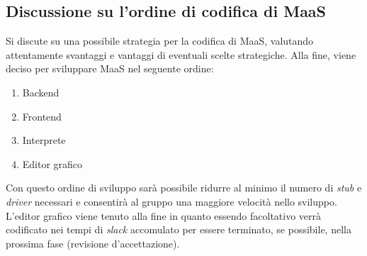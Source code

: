 \documentclass[11pt]{meetingmins}
\begin{document}
\subsection{Discussione su l'ordine di codifica di MaaS}

Si discute su una possibile strategia per la codifica di MaaS, valutando attentamente svantaggi e vantaggi di eventuali scelte strategiche. Alla fine, viene deciso per sviluppare MaaS nel seguente ordine:
\begin{enumerate}

\item Backend
\item Frontend
\item Interprete
\item Editor grafico
\end{enumerate}

Con questo ordine di sviluppo sar\`a possibile ridurre al minimo il numero di \textit{stub} e \textit{driver} necessari e consentir\`a al gruppo una maggiore velocit\`a nello sviluppo. L'editor grafico viene tenuto alla fine in quanto essendo facoltativo verr\`a codificato nei tempi di \textit{slack} accomulato per essere terminato, se possibile, nella prossima fase (revisione d'accettazione).


\end{document}
